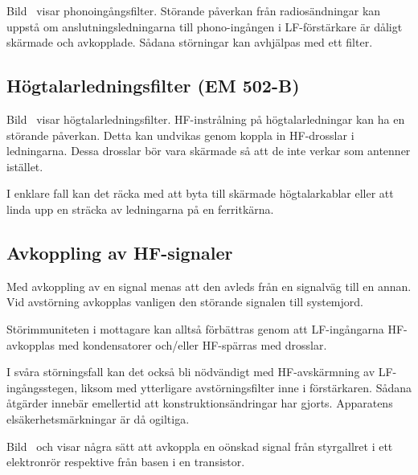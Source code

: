Bild~ visar phonoingångsfilter.
Störande påverkan från radiosändningar kan uppstå om anslutningsledningarna
till phono-ingången i LF-förstärkare är dåligt skärmade och avkopplade.
Sådana störningar kan avhjälpas med ett filter.

\newpage
\subsection{Högtalarledningsfilter (EM 502-B)}

Bild~ visar högtalarledningsfilter.
HF-instrålning på högtalarledningar kan ha en störande påverkan.
Detta kan undvikas genom koppla in HF-drosslar i ledningarna.
Dessa drosslar bör vara skärmade så att de inte verkar som antenner istället.

I enklare fall kan det räcka med att byta till skärmade högtalarkablar
eller att linda upp en sträcka av ledningarna på en ferritkärna.

\newpage
\subsection{Avkoppling av HF-signaler}




Med avkoppling av en signal menas att den avleds från en signalväg till en
annan.
Vid avstörning avkopplas vanligen den störande signalen till systemjord.

Störimmuniteten i mottagare kan alltså förbättras genom att LF-ingångarna
HF-avkopplas med kondensatorer och/eller HF-spärras med drosslar.

I svåra störningsfall kan det också bli nödvändigt med HF-avskärmning av
LF-ingångsstegen, liksom med ytterligare avstörningsfilter inne i förstärkaren.
Sådana åtgärder innebär emellertid att konstruktionsändringar har gjorts.
Apparatens elsäkerhetsmärkningar är då ogiltiga.

Bild~ och  visar några sätt att
avkoppla en oönskad signal från styrgallret i ett elektronrör respektive från
basen i en transistor.

